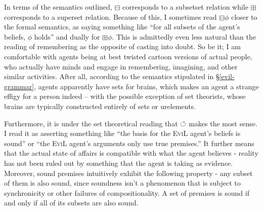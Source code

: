 In terms of the semantics outlined, $\boxminus$ corresponds to a subsetset
relation while $\boxplus$ corresponds to a superset relation.  Because of
this, I sometimes read $\boxminus \phi$ closer to the formal semantics, as
saying something like ``for all subsets of the agent's beliefs, $\phi$ holds''
and dually for $\boxplus \phi$.  This is admittedly even less natural than
the reading of remembering as the opposite of casting into doubt.  So be it;
I am comfortable with  agents being at best twisted cartoon
versions of actual people, who actually have minds and engage in remembering,
imagining, and other similar activities.  After all, according to the
semantics stipulated in \S\ref{evil-grammar},  agents apparently have sets
for brains, which makes an  agent a strange effigy for a person
indeed -- with the possible exception of set theorists, whose brains are
typically constructed entirely of sets or urelements.

Furthermore, it is under the set theoretical reading that $\circlearrowleft$ makes
the most sense.  I read it as asserting something like ``the basis for
the \textsc{EviL} agent's beliefs is sound'' or ``the \textsc{EviL}
agent's arguments only use true premises.''  It further means that the
actual state of affairs is compatible with what the agent believes -
reality has not been ruled out by something that the agent is taking
as evidence.  Moreover, sound premises intuitively exhibit the
following property - any subset of them is also sound, since soundness
isn't a phenomenon that is subject to synchronicity or other failures
of compositionality.  A set of premises is sound if and only if all of
its subsets are also sound.

